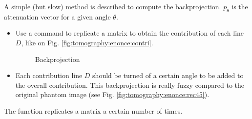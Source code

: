 A simple (but slow) method is described to compute the backprojection.
$p_\theta$ is the attenuation vector for a given angle $\theta$.
\begin{itemize}
 \item  Use a command to replicate a matrix to obtain the contribution of each line $D$, like on Fig. \ref{fig:tomography:enonce:contri}.
\begin{figure}[htbp]
\centering\caption{Backprojection}%
\hfill
{}%
\label{fig:tomography:enonce:retroprojection}%
\end{figure}
 \item Each contribution line $D$ should be turned of a certain angle to be added to the overall contribution. This backprojection is really fuzzy compared to the original phantom image (see Fig. \ref{fig:tomography:enonce:rec45}).
\end{itemize}

\begin{mcomment}
\begin{mremark}The function  replicates a matrix a certain number of times.
\end{mremark}
\end{mcomment}

